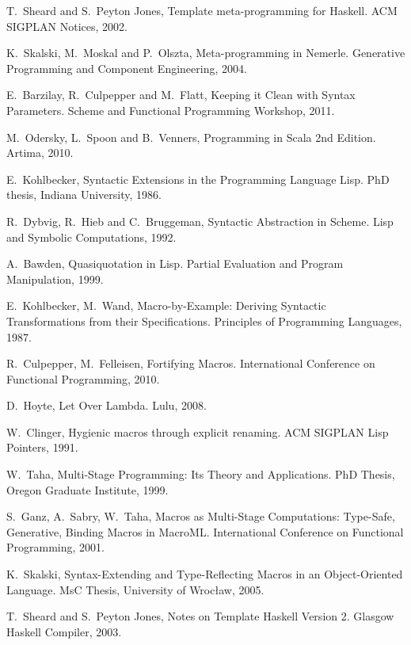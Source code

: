\documentclass[10pt,journal,a4paper]{IEEEtran}
\begin{document}
\begin{thebibliography}{99}

T.~Sheard and S.~Peyton Jones,
Template meta-programming for Haskell.
ACM SIGPLAN Notices, 2002.

K.~Skalski, M.~Moskal and P.~Olszta,
Meta-programming in Nemerle.
Generative Programming and Component Engineering, 2004.

E.~Barzilay, R.~Culpepper and M.~Flatt,
Keeping it Clean with Syntax Parameters.
Scheme and Functional Programming Workshop, 2011.

M.~Odersky, L.~Spoon and B.~Venners,
Programming in Scala 2nd Edition.
Artima, 2010.

E.~Kohlbecker,
Syntactic Extensions in the Programming Language Lisp.
PhD thesis, Indiana University, 1986.

R.~Dybvig, R.~Hieb and  C.~Bruggeman,
Syntactic Abstraction in Scheme.
Lisp and Symbolic Computations, 1992.

A.~Bawden,
Quasiquotation in Lisp.
Partial Evaluation and Program Manipulation, 1999.

E.~Kohlbecker, M.~Wand,
Macro-by-Example: Deriving Syntactic Transformations from their Specifications.
Principles of Programming Languages, 1987.

R.~Culpepper, M.~Felleisen,
Fortifying Macros.
International Conference on Functional Programming, 2010.

D.~Hoyte,
Let Over Lambda.
Lulu, 2008.

W.~Clinger,
Hygienic macros through explicit renaming.
ACM SIGPLAN Lisp Pointers, 1991.

W.~Taha,
Multi-Stage Programming: Its Theory and Applications.
PhD Thesis, Oregon Graduate Institute, 1999.

S.~Ganz, A.~Sabry, W.~Taha,
Macros as Multi-Stage Computations: Type-Safe, Generative, Binding Macros in MacroML.
International Conference on Functional Programming, 2001.

K.~Skalski,
Syntax-Extending and Type-Reflecting Macros in an Object-Oriented Language.
MsC Thesis, University of Wroc{\l}aw, 2005.

T.~Sheard and S.~Peyton Jones,
Notes on Template Haskell Version 2.
Glasgow Haskell Compiler, 2003.

\end{thebibliography}
\end{document}
